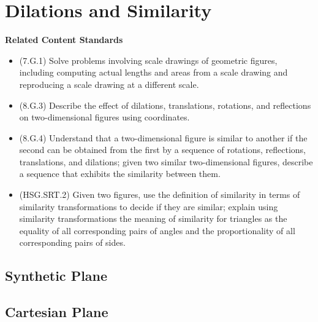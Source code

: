 \documentclass[
]{book}
\providecommand{\tightlist}{%
  \setlength{\itemsep}{0pt}\setlength{\parskip}{0pt}}
\newenvironment{standards}{}{}
\theoremstyle{definition}
\theoremstyle{definition}
\theoremstyle{definition}
\theoremstyle{definition}
\theoremstyle{remark}
\begin{document}
\hypertarget{dilations-and-similarity}{%
\section{Dilations and Similarity}\label{dilations-and-similarity}}

\begin{standards}

\begin{center}
\textbf{Related Content Standards}

\end{center}

\begin{itemize}
\tightlist
\item
  (7.G.1) Solve problems involving scale drawings of geometric figures, including computing actual lengths and areas from a scale drawing and reproducing a scale drawing at a different scale.
\item
  (8.G.3) Describe the effect of dilations, translations, rotations, and reflections on two-dimensional figures using coordinates.
\item
  (8.G.4) Understand that a two-dimensional figure is similar to another if the second can be obtained from the first by a sequence of rotations, reflections, translations, and dilations; given two similar two-dimensional figures, describe a sequence that exhibits the similarity between them.
\item
  (HSG.SRT.2) Given two figures, use the definition of similarity in terms of similarity transformations to decide if they are similar; explain using similarity transformations the meaning of similarity for triangles as the equality of all corresponding pairs of angles and the proportionality of all corresponding pairs of sides.
\end{itemize}

\end{standards}

\hypertarget{synthetic-plane-5}{%
\subsection{Synthetic Plane}\label{synthetic-plane-5}}

\hypertarget{cartesian-plane-1}{%
\subsection{Cartesian Plane}\label{cartesian-plane-1}}
\end{document}
